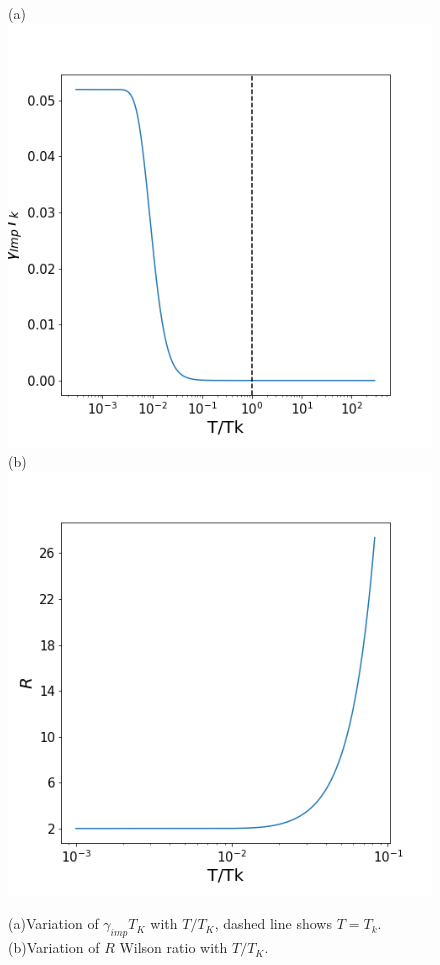 \documentclass[aps,prb,preprint,groupedaddress]{revtex4-2}
\begin{document}
\begin{figure}
(a)\includegraphics[scale=0.5]{specificHeatCoeff.png}
(b)\includegraphics[scale=0.5]{WilsonRatio.png}
\caption{(a)Variation of $\gamma_{imp}T_{K}$ with $T/T_{K}$, dashed line shows $T=T_{k}$. (b)Variation of $R$ Wilson ratio with $T/T_{K}$.}
\end{figure}
\end{document}
